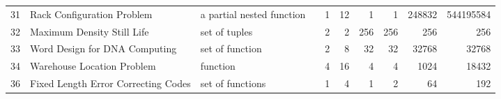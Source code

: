 \begin{sidewaystable}
\begin{center}
\begin{tabular}{r|l|l|l|r|r|r|r|r|r}
 31     &   Rack Configuration Problem                                      &   a partial nested function                                                                                 &   \cite{kiziltan2001symmetry}                                          & 1                & 12               & 1                                                    & 1                                     & 248832                                                      & 544195584                                                   \\
 32     &   Maximum Density Still Life                                      &   set of tuples                                                                                             &   \cite{life-models-04, smith-model-life, CHU20121}                    & 2                & 2                & 256                                                  & 256                                   & 256                                                         & 256                                                         \\
 33     &   Word Design for DNA Computing                                   &   set of function                                                                                           &   \cite{DBLP:conf/ijcai/Codish0L17}                                    & 2                & 8                & 32                                                   & 32                                    & 32768                                                       & 32768                                                       \\
 34     &   Warehouse Location Problem                                      &   function                                                                                                  &   \cite{BrahimThesis}                                                  & 4                & 16               & 4                                                    & 4                                     & 1024                                                        & 18432                                                       \\
 36     &   Fixed Length Error Correcting Codes                             &   set of functions                                                                                          &   \cite{Frisch2003_MoreSym}                                            & 1                & 4                & 1                                                    & 2                                     & 64                                                          & 192                                                         \\

\end{tabular}
\end{center}
\end{sidewaystable}
